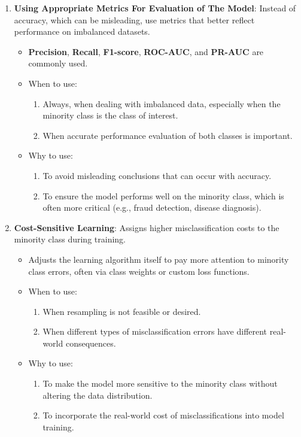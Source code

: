 \documentclass[a4paper,12pt]{article}
\begin{document}
\begin{enumerate}
    \item \textbf{Using Appropriate Metrics For Evaluation of The Model}: Instead of accuracy, which can be misleading, use metrics that better reflect performance on imbalanced datasets.
    \begin{itemize}
        \item \textbf{Precision}, \textbf{Recall}, \textbf{F1-score}, \textbf{ROC-AUC}, and \textbf{PR-AUC} are commonly used.
        \item When to use:
        \begin{enumerate}
            \item Always, when dealing with imbalanced data, especially when the minority class is the class of interest.
            \item When accurate performance evaluation of both classes is important.
        \end{enumerate}
        \item Why to use:
        \begin{enumerate}
            \item To avoid misleading conclusions that can occur with accuracy.
            \item To ensure the model performs well on the minority class, which is often more critical (e.g., fraud detection, disease diagnosis).
        \end{enumerate}
    \end{itemize}

    \item \textbf{Cost-Sensitive Learning}: Assigns higher misclassification costs to the minority class during training.
    \begin{itemize}
        \item Adjusts the learning algorithm itself to pay more attention to minority class errors, often via class weights or custom loss functions.
        \item When to use:
        \begin{enumerate}
            \item When resampling is not feasible or desired.
            \item When different types of misclassification errors have different real-world consequences.
        \end{enumerate}
        \item Why to use:
        \begin{enumerate}
            \item To make the model more sensitive to the minority class without altering the data distribution.
            \item To incorporate the real-world cost of misclassifications into model training.
        \end{enumerate}
    \end{itemize}


\end{enumerate}
\end{document}
